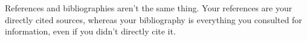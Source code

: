\documentclass[12pt]{report}
\begin{document}
    References and bibliographies aren't the same thing. Your references 
    are your directly cited sources, whereas your bibliography is everything you 
    consulted for information, even if you didn't directly cite it. \\

    \printbibliography[keyword={refs}, title = {References}]

    \printbibliography[keyword={bib}] %
\end{document}
